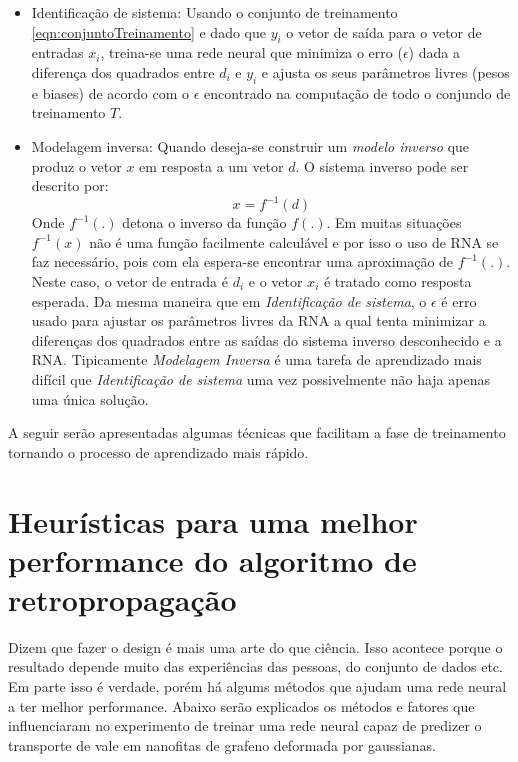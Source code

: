 \begin{itemize}
    \item Identificação de sistema: Usando o conjunto de treinamento \ref{eqn:conjuntoTreinamento} e dado que $y_i$ o vetor de saída para o vetor de entradas $x_i$, treina-se uma rede neural que minimiza o erro ($\epsilon$) dada a diferença dos quadrados entre $d_i$ e $y_i$ e ajusta os seus parâmetros livres (pesos e biases) de acordo com o $\epsilon$ encontrado na computação de todo o conjundo de treinamento $T$.
    \item Modelagem inversa: Quando deseja-se construir um \textit{modelo inverso} que produz o vetor \textbf{$x$} em resposta a um vetor $d$. O sistema inverso pode ser descrito por:
    \begin{equation*}
        x=f^{-1}(d)
    \end{equation*}
    Onde $f^{-1}(.)$ detona o inverso da função $f(.)$. Em muitas situações $f^{-1}(x)$ não é uma função facilmente calculável e por isso o uso de RNA se faz necessário, pois com ela espera-se encontrar uma aproximação de $f^{-1}(.)$. Neste caso, o vetor de entrada é $d_i$ e o vetor $x_i$ é tratado como resposta esperada. Da mesma maneira que em \textit{Identificação de sistema}, o $\epsilon$ é erro usado para ajustar os parâmetros livres da RNA a qual tenta minimizar a diferenças dos quadrados entre as saídas do sistema inverso desconhecido e a RNA. Tipicamente \textit{Modelagem Inversa} é uma tarefa de aprendizado mais difícil que \textit{Identificação de sistema} uma vez possivelmente não haja apenas uma única solução.
\end{itemize}

A seguir serão apresentadas algumas técnicas que facilitam a fase de treinamento tornando o processo de aprendizado mais rápido.

\section{Heurísticas para uma melhor performance do algoritmo de retropropagação}
Dizem que fazer o design é mais uma arte do que ciência. Isso acontece porque o resultado depende muito das experiências das pessoas, do conjunto de dados etc. Em parte isso é verdade, porém há algums métodos que ajudam uma rede neural a ter melhor performance. Abaixo serão explicados os métodos e fatores que influenciaram no experimento de treinar uma rede neural capaz de predizer o transporte de vale em nanofitas de grafeno deformada por gaussianas.

